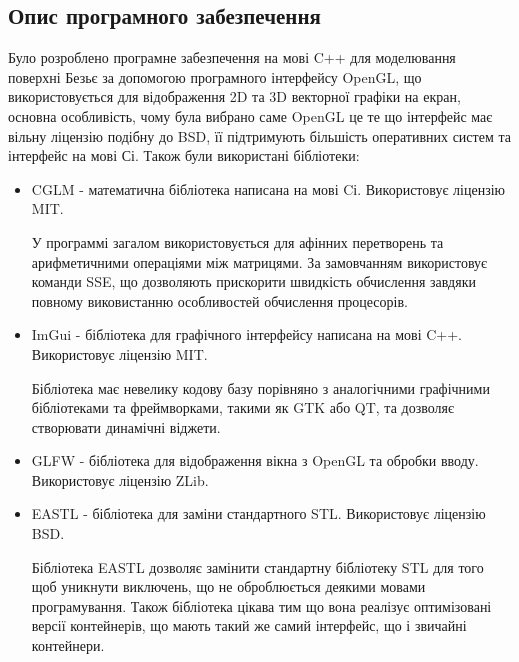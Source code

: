 \let\mypdfximage\pdfximage\def\pdfximage{\immediate\mypdfximage}\documentclass[14pt,a4paper]{extarticle}
\theoremstyle{definition}
\renewcommand{\[}{\begin{singlespace}\begin{equation*}}
\renewcommand{\]}{\end{equation*}\end{singlespace}}
\renewcommand{\+}{\discretionary{\mbox{\scriptsize$\hookleftarrow$}}{}{}}
\begin{document}
\subsection{Опис програмного забезпечення}

Було розроблено програмне забезпечення на мові C++ для моделювання поверхні Безьє за допомогою програмного інтерфейсу OpenGL, що використовується для відображення 2D та 3D векторної графіки на екран, основна особливість, чому була вибрано саме OpenGL це те що інтерфейс має вільну ліцензію подібну до BSD, її підтримують більшість оперативних систем та інтерфейс на мові Сі. Також були використані бібліотеки:

\begin{itemize}
\item CGLM - математична бібліотека написана на мові Cі. Використовує ліцензію MIT.

У программі загалом використовується для афінних перетворень та арифметичними операціями між матрицями. За замовчанням використовує команди SSE, що дозволяють прискорити швидкість обчислення завдяки повному виковистанню особливостей обчислення процесорів.

\item ImGui - бібліотека для графічного інтерфейсу написана на мові C++. Використовує ліцензію MIT.

Бібліотека має невелику кодову базу порівняно з аналогічними графічними бібліотеками та фреймворками, такими як GTK або QT, та дозволяє створювати динамічні віджети.

\item GLFW - бібліотека для відображення вікна з OpenGL та обробки вводу. Використовує ліцензію ZLib.

\item EASTL - бібліотека для заміни стандартного STL. Використовує ліцензію BSD.

Бібліотека EASTL дозволяє замінити стандартну бібліотеку STL для того щоб уникнути виключень, що не оброблюється деякими мовами програмування. Також бібліотека цікава тим що вона реалізує оптимізовані версії контейнерів, що мають такий же самий інтерфейс, що і звичайні контейнери.
\end{itemize}
\end{document}
